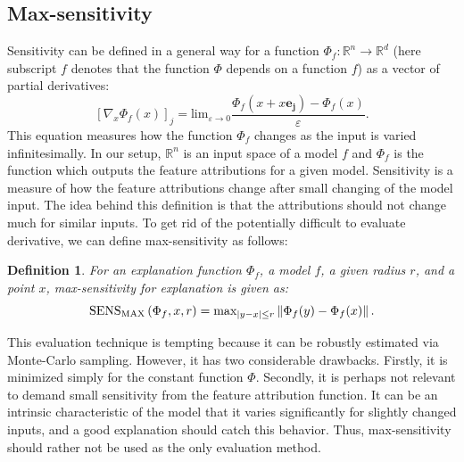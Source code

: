 \documentclass[magisterska,en]{pracamgr}
\newtheorem{defi}{Definition}[section]
\begin{document}
\subsection{Max-sensitivity}
Sensitivity can be defined in a general way for a function $\Phi _f : \mathbb{R}^n \rightarrow \mathbb{R}^d$ (here subscript $f$ denotes that the function $\Phi$ depends on a function $f$) as a vector of partial derivatives:
\begin{equation}
    \left[ \nabla_{x} \Phi _{f}(x)\right]_j = \textrm{lim}_{\varepsilon \rightarrow 0} 
    \frac{\Phi _{f} (x + x \textbf{e}_{\textbf{j}} ) - \Phi_{f}(x)}
    {\varepsilon}.
\end{equation}
This equation measures how the function $\Phi _f$ changes as the input is varied infinitesimally.
In our setup, $\mathbb{R}^n$ is an input space of a model $f$ and $\Phi _f$ is the function which outputs the feature attributions for a given model. Sensitivity is a measure of how the feature attributions change after small changing of the model input. The idea behind this definition is that the attributions should not change much for similar inputs. To get rid of the potentially difficult to evaluate derivative, we can define max-sensitivity as follows:
\begin{defi}
    For an explanation function $\Phi _f $, a model $f$,  a given radius $r$, and a point $x$, max-sensitivity for explanation is given as:
    \begin{equation}
        \textup{SENS}_{\textup{MAX}} \left(\Phi _f, x, r \right) = \textup{max} _{|y-x| \leq r} \left\| \Phi _f(y) - \Phi _f(x)\right\|.
    \end{equation}
\end{defi}

This evaluation technique is tempting because it can be robustly estimated via Monte-Carlo sampling. However, it has two considerable drawbacks. Firstly, it is minimized simply for the constant function $\Phi$. Secondly, it is perhaps not relevant to demand small sensitivity from the feature attribution function. It can be an intrinsic characteristic of the model that it varies significantly for slightly changed inputs, and a good explanation should catch this behavior. Thus, max-sensitivity should rather not be used as the only evaluation method.
\end{document}
